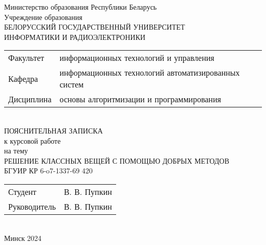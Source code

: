 \begin{titlepage}
  \begin{center}
    Министерство образования Республики Беларусь\\[1em]
    Учреждение образования\\
    БЕЛОРУССКИЙ ГОСУДАРСТВЕННЫЙ УНИВЕРСИТЕТ \\
    ИНФОРМАТИКИ И РАДИОЭЛЕКТРОНИКИ\\[1em]

    \begin{minipage}{\textwidth}
      \begin{flushleft}
        \begin{tabular}{ l l }
          Факультет & информационных технологий и управления\\
          Кафедра & информационных технологий автоматизированных систем\\
          Дисциплина & основы алгоритмизации и программирования
        \end{tabular}
      \end{flushleft}
    \end{minipage}\\[1em]

    \vfill
    {ПОЯСНИТЕЛЬНАЯ ЗАПИСКА}\\
    {к курсовой работе}\\
    {на тему}\\[1em]
    \MakeUppercase{Решение классных вещей с помощью добрых методов}\\[1em]
    {БГУИР  КР 6-o7-1337-69 420}\\
        \vfill
    \begin{tabular}{ p{}p{} }
      Студент & В. В. Пупкин \\
      Руководитель & В. В. Пупкин \\
    \end{tabular}
    \textbf{\large \MakeUppercase {}}\\[5em]
    {\normalsize Минск 2024}
  \end{center}
\end{titlepage}
